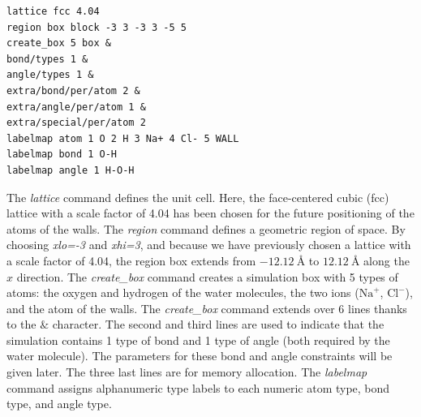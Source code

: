 \documentclass[9pt,tutorial]{livecoms}
\begin{document}
\begin{lstlisting}
lattice fcc 4.04
region box block -3 3 -3 3 -5 5
create_box 5 box &
bond/types 1 &
angle/types 1 &
extra/bond/per/atom 2 &
extra/angle/per/atom 1 &
extra/special/per/atom 2
labelmap atom 1 O 2 H 3 Na+ 4 Cl- 5 WALL
labelmap bond 1 O-H
labelmap angle 1 H-O-H
\end{lstlisting}
The \textit{lattice} command defines the unit cell. Here, the face-centered cubic (fcc) lattice
with a scale factor of 4.04 has been chosen for the future positioning of the atoms
of the walls. The \textit{region} command defines a geometric region of space. By choosing
\textit{xlo=-3} and \textit{xhi=3}, and because we have previously chosen a lattice with a scale
factor of 4.04, the region box extends from $-12.12~\text{\AA{}}$ to $12.12~\text{\AA{}}$
along the $x$ direction. The \textit{create\_box} command creates a simulation box with
5 types of atoms: the oxygen and hydrogen of the water molecules, the two ions ($\text{Na}^+$,
$\text{Cl}^-$), and the atom of the walls. The \textit{create\_box} command extends over 6
lines thanks to the $\&$ character. The second and third lines are used to indicate that the
simulation contains 1 type of bond and 1 type of angle (both required by the water molecule).
The parameters for these bond and angle constraints will be given later. The three last
lines are for memory allocation. The \textit{labelmap} command assigns alphanumeric type labels
to each numeric atom type, bond type, and angle type.
\end{document}
